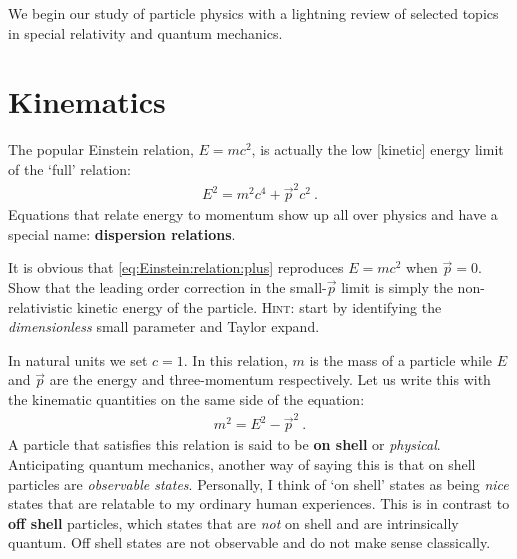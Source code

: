 \documentclass[12pt, oneside]{report}    %
\let\oldsection\section
\def\section{%
  \setcounter{sidenote}{1}%
  \oldsection
}
\begin{document}
We begin our study of particle physics with a lightning review of selected topics in special relativity and quantum mechanics.

\section{Kinematics}

The popular Einstein relation, $E = mc^2$, is actually the low [kinetic] energy limit of the `full' relation:
\begin{align}
    E^2 = m^2 c^4 + \vec{p}^2 c^2 \ .
    \label{eq:Einstein:relation:plus}
\end{align}
Equations that relate energy to momentum show up all over physics and have a special name: \textbf{dispersion relations}. 
\begin{exercise}
It is obvious that \eqref{eq:Einstein:relation:plus} reproduces $E=mc^2$ when $\vec{p}=0$. Show that the leading order correction in the small-$\vec{p}$ limit is simply the non-relativistic kinetic energy of the particle. \textsc{Hint:} start by identifying the \emph{dimensionless} small parameter and Taylor expand.
\end{exercise}
In natural units we set $c=1$. In this relation, $m$ is the mass of a particle while $E$ and $\vec{p}$ are the energy and three-momentum respectively. Let us write this with the kinematic quantities on the same side of the equation:
\begin{align}
    m^2 = E^2 - \vec{p}^2 \ .
\end{align}
A particle that satisfies this relation is said to be \textbf{on shell} or \emph{physical}. Anticipating quantum mechanics, another way of saying this is that on shell particles are \emph{observable states}. Personally, I think of `on shell' states as being \emph{nice} states that are relatable to my ordinary human experiences. This is in contrast to \textbf{off shell} particles, which states that are \emph{not} on shell and are intrinsically quantum. Off shell states are not observable and do not make sense classically. 
\end{document}

